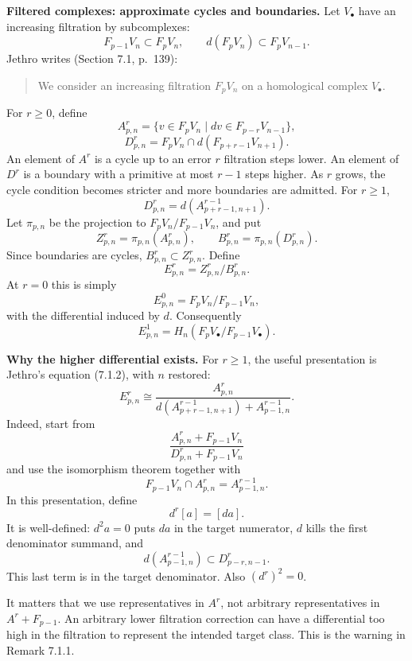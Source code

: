 \medskip\noindent
{\bf Filtered complexes: approximate
cycles and boundaries.}
Let $V_\bullet$ have an increasing
filtration by subcomplexes:
$$
F_{p-1}V_n\subset F_pV_n,
\qquad d(F_pV_n)\subset F_pV_{n-1}.
$$
Jethro writes (Section 7.1, p.~139):
\begin{quote}
We consider an increasing filtration
$F_pV_n$ on a homological complex
$V_\bullet$.
\end{quote}
For $r\geq0$, define
$$
A^r_{p,n}=\{v\in F_pV_n\mid
 dv\in F_{p-r}V_{n-1}\},
$$
$$
D^r_{p,n}=F_pV_n\cap
 d(F_{p+r-1}V_{n+1}).
$$
An element of $A^r$ is a cycle up to an
error $r$ filtration steps lower.
An element of $D^r$ is a boundary with a
primitive at most $r-1$ steps higher.
As $r$ grows, the cycle condition becomes
stricter and more boundaries are admitted.
For $r\geq1$,
$$
D^r_{p,n}=d(A^{r-1}_{p+r-1,n+1}).
$$
Let $\pi_{p,n}$ be the projection to
$F_pV_n/F_{p-1}V_n$, and put
$$
Z^r_{p,n}=\pi_{p,n}(A^r_{p,n}),
\qquad
B^r_{p,n}=\pi_{p,n}(D^r_{p,n}).
$$
Since boundaries are cycles,
$B^r_{p,n}\subset Z^r_{p,n}$. Define
$$
E^r_{p,n}=Z^r_{p,n}/B^r_{p,n}.
$$
At $r=0$ this is simply
$$
E^0_{p,n}=F_pV_n/F_{p-1}V_n,
$$
with the differential induced by $d$.
Consequently
$$
E^1_{p,n}=H_n(F_pV_\bullet/
F_{p-1}V_\bullet).
$$

\medskip\noindent
{\bf Why the higher differential exists.}
For $r\geq1$, the useful presentation is
Jethro's equation (7.1.2), with $n$
restored:
$$
E^r_{p,n}\cong
\frac{A^r_{p,n}}
{d(A^{r-1}_{p+r-1,n+1})+
 A^{r-1}_{p-1,n}}.
$$
Indeed, start from
$$
\frac{A^r_{p,n}+F_{p-1}V_n}
{D^r_{p,n}+F_{p-1}V_n}
$$
and use the isomorphism theorem together
with
$$
F_{p-1}V_n\cap A^r_{p,n}
=A^{r-1}_{p-1,n}.
$$
In this presentation, define
$$
d^r[a]=[da].
$$
It is well-defined: $d^2a=0$ puts $da$
in the target numerator, $d$ kills the
first denominator summand, and
$$
d(A^{r-1}_{p-1,n})
\subset D^r_{p-r,n-1}.
$$
This last term is in the target
denominator. Also $(d^r)^2=0$.

It matters that we use representatives
in $A^r$, not arbitrary representatives
in $A^r+F_{p-1}$. An arbitrary lower
filtration correction can have a
differential too high in the filtration
to represent the intended target class.
This is the warning in Remark 7.1.1.

